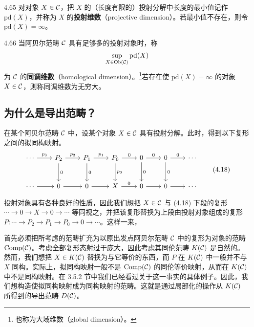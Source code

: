 \begin{definition}{4.65}
对对象 $X\in\mathcal{C}$，把 $X$ 的（长度有限的）投射分解中长度的最小值记作 $\mathrm{pd}(X)$，并称为 $X$ 的\textbf{投射维数}（projective dimension）。若最小值不存在，则令 $\mathrm{pd}(X)=\infty$。
\end{definition}

\begin{definition}{4.66}
当阿贝尔范畴 $\mathcal{C}$ 具有足够多的投射对象时，称
\[ \sup_{X\in\operatorname{Ob}(\mathcal{C})}\mathrm{pd}(X) \]
为 $\mathcal{C}$ 的\textbf{同调维数}（homological dimension）。\footnote{也称为大域维数（global dimension）。}若存在使 $\mathrm{pd}(X)=\infty$ 的对象 $X\in\mathcal{C}$，则称同调维数为无穷大。
\end{definition}

\subsection{为什么是导出范畴？}

在某个阿贝尔范畴 $\mathcal{C}$ 中，设某个对象 $X\in\mathcal{C}$ 具有投射分解。此时，得到以下复形之间的拟同构映射。
\begin{equation}
\begin{tikzcd}[row sep=2.6em, column sep=2.2em]
  \cdots \arrow[r,"p_3"] & P_2 \arrow[r,"p_2"] \arrow[d,"0"] & P_1 \arrow[r,"p_1"] \arrow[d,"0"] & P_0 \arrow[r,"0"] \arrow[d,"p_0"] & 0 \arrow[r,"0"] \arrow[d,"0"] & 0 \arrow[r,"0"] \arrow[d,"0"] & \cdots \\
  \cdots \arrow[r] & 0 \arrow[r] & 0 \arrow[r] & X \arrow[r,"0"] & 0 \arrow[r] & 0 \arrow[r] & \cdots
\end{tikzcd} \tag{4.18}
\end{equation}

投射对象具有各种良好的性质，因此我们想把 $X\in\mathcal{C}$ 与 (4.18) 下段的复形 $\cdots\to 0\to X\to 0\to\cdots$ 等同视之，并把该复形替换为上段由投射对象组成的复形 $P\colon\cdots\to P_2\to P_1\to P_0\to 0\to\cdots$。这样一来，

首先必须把所考虑的范畴扩充为以原出发点阿贝尔范畴 $\mathcal{C}$ 中的复形为对象的范畴 $\operatorname{Comp}(\mathcal{C})$。考虑全部复形态射过于庞大，因此考虑其同伦范畴 $K(\mathcal{C})$ 是自然的。然而，我们想把 $X\in K(\mathcal{C})$ 替换为与它等价的东西，而 $P$ 在 $K(\mathcal{C})$ 中一般并不与 $X$ 同构。实际上，拟同构映射一般不是 $\operatorname{Comp}(\mathcal{C})$ 的同伦等价映射，从而在 $K(\mathcal{C})$ 中不是同构映射。在 3.5.2 节中我们已经看过关于这一事实的具体例子。因此，我们想构造使拟同构映射成为同构映射的范畴。这就是通过局部化的操作从 $K(\mathcal{C})$ 所得到的导出范畴 $D(\mathcal{C})$。

